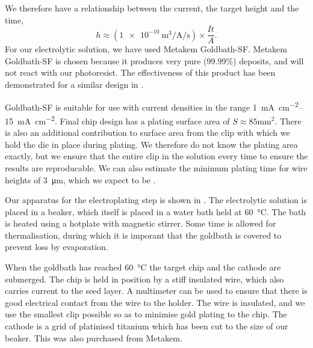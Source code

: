 We therefore have a relationship between the current, the target height and the
time,
%
\begin{equation}
  h \approx \left(
  \SI[per-mode=fraction]{1e-10}{\meter\cubed\per\ampere\per\second} \right)
  \times\frac{It}{A}.
\end{equation}
%
For our electrolytic solution, we have used Metakem Goldbath-SF.
Metakem Goldbath-SF is chosen because it produces very pure (99.99\%) deposits,
and will not react with our photoresist. The effectiveness of this product has
been demonstrated for a similar design in .
%

Goldbath-SF is suitable for use with current densities in the range
\SIrange{1}{15}{\milli\ampere\per\centi\meter\squared}. Final chip design has a
plating surface area of $S\approx85\si{\milli\meter\squared}$. There is also an
additional contribution to surface area from the clip with which we hold the
die in place during plating. We therefore do not know the plating area
exactly, but we ensure that the entire clip in the solution every time to
ensure the results are reproducable. We can also estimate the minimum plating
time for wire heights of \SI{3}{\micro\meter}, which we expect to be
.


Our apparatus for the electroplating step is shown in
. The electrolytic solution is placed in a
beaker, which itself is placed in a water bath held at \SI{60}{\celsius}. The
bath is heated using a hotplate with magnetic stirrer. Some time is allowed for
thermalisation, during which it is imporant that the goldbath is covered to
prevent loss by evaporation.

When the goldbath has reached \SI{60}{\celsius} the target chip and the cathode
are submerged. The chip is held in position by a stiff insulated wire, which
also carries current to the seed layer. A multimeter can be used to ensure that
there is good electrical contact from the wire to the holder. The wire is
insulated, and we use the smallest clip possible so as to minimise gold plating
to the chip.  The cathode is a grid of platinised titanium which has been cut
to the size of our beaker.  This was also purchased from Metakem.


